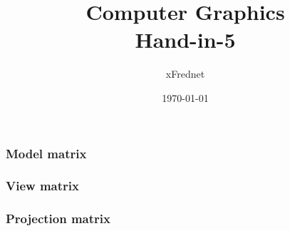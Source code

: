 \documentclass{article}
\title{Computer Graphics\\Hand-in-5}
\author{xFrednet}
\date{\today}
\begin{document}
    \subsubsection{Model matrix}
    
    \subsubsection{View matrix}
    
    \subsubsection{Projection matrix}
    

    \maketitle
    \newpage

    \tableofcontents
    \newpage

    
    \newpage

    
    \newpage

    
    \newpage

    
    \newpage

    
    \newpage

    
    \newpage

    
    \newpage

    
\end{document}
